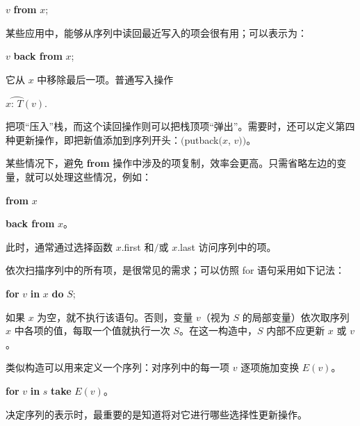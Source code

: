 \documentclass[twoside,11pt,fontset=none]{ctexbook}
\let\wideparen\overparen
\begin{document}
\quad $v$ \textbf{from} $x$;

\noindent
某些应用中，能够从序列中读回最近写入的项会很有用；可以表示为：

\quad $v$ \textbf{back from} $x$;

\noindent
它从 $x$ 中移除最后一项。普通写入操作

\quad $x\wideparen{\text{: } T}(v).$

\noindent
把项“压入”栈，而这个读回操作则可以把栈顶项“弹出”。需要时，还可以定义第四种更新操作，即把新值添加到序列开头：$($putback$(x$, $v))$。

某些情况下，避免 \textbf{from} 操作中涉及的项复制，效率会更高。只需省略左边的变量，就可以处理这些情况，例如：

\quad \textbf{from} $x$

\quad \textbf{back from} $x$。

\noindent
此时，通常通过选择函数 $x$.first 和$/$或 $x$.last 访问序列中的项。

依次扫描序列中的所有项，是很常见的需求；可以仿照 for 语句采用如下记法：

\quad \textbf{for} $v$ \textbf{in} $x$ \textbf{do} $S$;

\noindent
如果 $x$ 为空，就不执行该语句。否则，变量 $v$（视为 $S$ 的局部变量）依次取序列 $x$ 中各项的值，每取一个值就执行一次 $S$。在这一构造中，$S$ 内部不应更新 $x$ 或 $v$。

类似构造可以用来定义一个序列：对序列中的每一项 $v$ 逐项施加变换 $E(v)$。

\quad \textbf{for} $v$ \textbf{in} $s$ \textbf{take} $E(v)$。

决定序列的表示时，最重要的是知道将对它进行哪些选择性更新操作。
\end{document}
